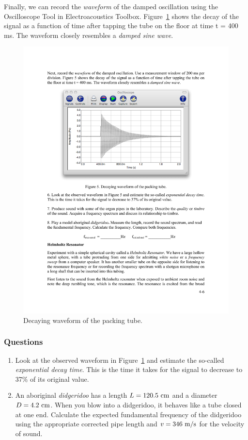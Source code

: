 \documentclass[11pt]{NSF}
\def\ben{\begin{enumerate}}
\def\een{\end{enumerate}}
\def\i{\item{}}
\begin{document}
Finally, we can record the {\em waveform} of the damped oscillation using 
the Oscilloscope Tool in Electroacoustics Toolbox.
Figure~\ref{f:5} shows the decay of the signal as a function of
time after tapping the tube on the floor at time t = 400 ms. The waveform
closely resembles a {\em damped sine wave}.
%
\begin{figure}[hbtp]
\begin{center}
\includegraphics[width=.7\textwidth]{fig4_5}
\caption{Decaying waveform of the packing tube.}
\label{f:5} 
\end{center} 
\end{figure}
%

\subsubsection*{Questions}
\ben
\i Look at the observed waveform in Figure~\ref{f:5} and 
estimate the so-called {\em exponential decay time}. 
This is the time it takes for the signal to decrease to
37\% of its original value.

\i An aboriginal {\em didgeridoo} has a length $L=120.5~{\rm cm}$
and a diameter $D=4.2~{\rm cm}$.
When you blow into a didgeridoo, it behaves like a tube closed at one end.
Calculate the expected fundamental frequency of the didgeridoo
using the appropriate corrected pipe length and $v=346~{\rm m/s}$
for the velocity of sound.

\een
\end{document}
